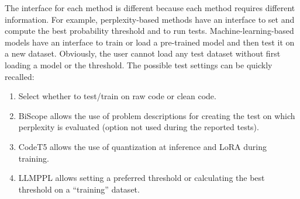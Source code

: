 The interface for each method is different because each method requires 
different information. For example, perplexity-based methods have an interface 
to set and compute the best probability threshold and to run tests. 
Machine-learning-based models have an interface to train or load a 
pre-trained model and then test it on a new dataset. Obviously, 
the user cannot load any test dataset without first loading a model 
or the threshold.
The possible test settings can be quickly recalled:
\begin{enumerate}
\item Select whether to test/train on raw code or clean code.
\item BiScope allows the use of problem descriptions for creating the test on which perplexity is evaluated (option not used during the reported tests).
\item CodeT5 allows the use of quantization at inference and LoRA during training.
\item LLMPPL allows setting a preferred threshold or calculating the best threshold on a “training” dataset.
\end{enumerate}
